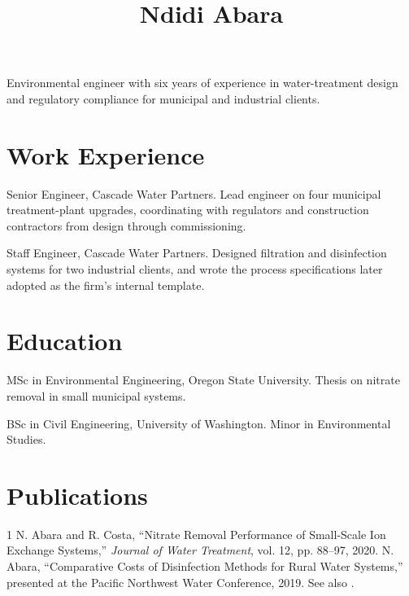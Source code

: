 \documentclass{simplecv}
\begin{document}


\title{Ndidi Abara}

\maketitle

Environmental engineer with six years of experience in water-treatment
design and regulatory compliance for municipal and industrial clients.

\section{Work Experience}

\begin{topic}
\item[2021--present] Senior Engineer, Cascade Water Partners. Lead
engineer on four municipal treatment-plant upgrades, coordinating with
regulators and construction contractors from design through
commissioning.

\item[2018--2021] Staff Engineer, Cascade Water Partners. Designed
filtration and disinfection systems for two industrial clients, and
wrote the process specifications later adopted as the firm's internal
template.
\end{topic}

\section{Education}

\begin{topic}
\item[2016--2018] MSc in Environmental Engineering, Oregon State
University. Thesis on nitrate removal in small municipal systems.
\item[2012--2016] BSc in Civil Engineering, University of Washington.
Minor in Environmental Studies.
\end{topic}

\section{Publications}

\begin{thebibliography}{1}
 N. Abara and R. Costa, ``Nitrate Removal Performance
of Small-Scale Ion Exchange Systems,'' \textit{Journal of Water
Treatment}, vol. 12, pp. 88--97, 2020.
 N. Abara, ``Comparative Costs of Disinfection
Methods for Rural Water Systems,'' presented at the Pacific Northwest
Water Conference, 2019. See also \cite{abara2020}.
\end{thebibliography}
\end{document}
